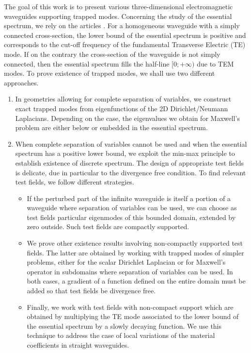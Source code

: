 \documentclass[11pt,a4paper]{article}
\begin{document}
\newline 
The goal of this work is to present various three-dimensional  electromagnetic waveguides supporting trapped modes. Concerning the study of the essential spectrum, we rely on the articles \cite{Filo19,FeMa24}.  For a homogeneous waveguide with a simply connected cross-section, the lower bound of the essential spectrum is positive and corresponds to the cut-off frequency of the fundamental Transverse Electric (TE) mode.  If on the contrary the cross-section of the waveguide is not simply connected, then the essential spectrum fills the half-line $[0;+\infty)$ due to  TEM modes. To prove existence of trapped modes, we shall use two different approaches. 
\begin{enumerate}
	\item In geometries allowing for complete separation of variables, we construct exact trapped modes from eigenfunctions of the 2D Dirichlet/Neumann Laplacians. Depending on the case, the eigenvalues we obtain for Maxwell's problem are either below or embedded in the essential spectrum. 
	\item When complete separation of variables cannot be used and when the essential spectrum has a positive lower bound, we exploit the min-max principle to establish existence of discrete spectrum. The design of appropriate test fields is delicate, due in particular to the divergence free condition. 
To find relevant test fields, we follow different strategies.
\begin{itemize}
\item If the perturbed part of the infinite waveguide is itself a portion of a waveguide where separation of variables can be used, we can choose as 
test fields particular eigenmodes of this bounded domain, extended by zero outside. Such test fields are compactly supported.
\item We prove other existence results involving non-compactly supported test fields. The latter are obtained by working with trapped modes of simpler problems, either for the scalar Dirichlet  Laplacian or for Maxwell's operator in subdomains where separation of variables can be used. In both cases, a gradient of a function defined on the entire domain must be added so that test fields be divergence free.
\item Finally, we work with test fields with non-compact support which are obtained by multiplying the TE mode associated to the lower bound of the essential spectrum by a slowly decaying
function. We use this technique to address the case of local variations of the material coefficients in straight waveguides. 
\end{itemize}
\end{enumerate}
\end{document}
